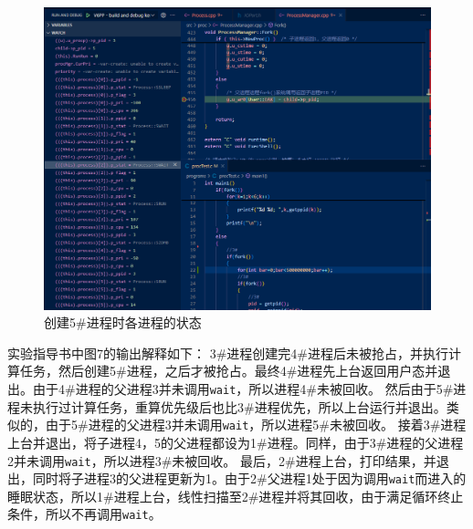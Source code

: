 \begin{figure}[!htbp]
    \centering
    \includegraphics[width=\textwidth]{images/2fork5.png}
    \caption{创建5\#进程时各进程的状态}\label{2fork5}
\end{figure}

实验指导书中图7的输出解释如下：
3\#进程创建完4\#进程后未被抢占，并执行计算任务，然后创建5\#进程，之后才被抢占。最终4\#进程先上台返回用户态并退出。由于4\#进程的父进程3并未调用\texttt{wait}，所以进程4\#未被回收。
然后由于5\#进程未执行过计算任务，重算优先级后也比3\#进程优先，所以上台运行并退出。类似的，由于5\#进程的父进程3并未调用\texttt{wait}，所以进程5\#未被回收。
接着3\#进程上台并退出，将子进程4，5的父进程都设为1\#进程。同样，由于3\#进程的父进程2并未调用\texttt{wait}，所以进程3\#未被回收。
最后，2\#进程上台，打印结果，并退出，同时将子进程3的父进程更新为1。由于2\#父进程1处于因为调用\texttt{wait}而进入的睡眠状态，所以1\#进程上台，线性扫描至2\#进程并将其回收，由于满足循环终止条件，所以不再调用\texttt{wait}。
